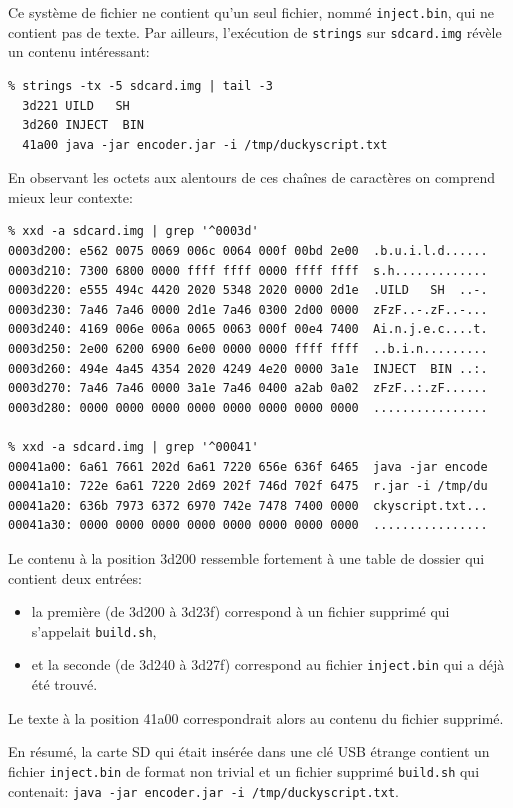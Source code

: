 \documentclass[a4paper,10pt]{article}
\begin{document}
Ce système de fichier ne contient qu'un seul fichier, nommé \texttt{inject.bin}, qui ne contient pas de texte.
Par ailleurs, l'exécution de \texttt{strings} sur \texttt{sdcard.img} révèle un contenu intéressant:
\begin{verbatim}
% strings -tx -5 sdcard.img | tail -3
  3d221 UILD   SH
  3d260 INJECT  BIN
  41a00 java -jar encoder.jar -i /tmp/duckyscript.txt
\end{verbatim}

En observant les octets aux alentours de ces chaînes de caractères on comprend mieux leur contexte:
\begin{verbatim}
% xxd -a sdcard.img | grep '^0003d'
0003d200: e562 0075 0069 006c 0064 000f 00bd 2e00  .b.u.i.l.d......
0003d210: 7300 6800 0000 ffff ffff 0000 ffff ffff  s.h.............
0003d220: e555 494c 4420 2020 5348 2020 0000 2d1e  .UILD   SH  ..-.
0003d230: 7a46 7a46 0000 2d1e 7a46 0300 2d00 0000  zFzF..-.zF..-...
0003d240: 4169 006e 006a 0065 0063 000f 00e4 7400  Ai.n.j.e.c....t.
0003d250: 2e00 6200 6900 6e00 0000 0000 ffff ffff  ..b.i.n.........
0003d260: 494e 4a45 4354 2020 4249 4e20 0000 3a1e  INJECT  BIN ..:.
0003d270: 7a46 7a46 0000 3a1e 7a46 0400 a2ab 0a02  zFzF..:.zF......
0003d280: 0000 0000 0000 0000 0000 0000 0000 0000  ................

% xxd -a sdcard.img | grep '^00041'
00041a00: 6a61 7661 202d 6a61 7220 656e 636f 6465  java -jar encode
00041a10: 722e 6a61 7220 2d69 202f 746d 702f 6475  r.jar -i /tmp/du
00041a20: 636b 7973 6372 6970 742e 7478 7400 0000  ckyscript.txt...
00041a30: 0000 0000 0000 0000 0000 0000 0000 0000  ................
\end{verbatim}

Le contenu à la position 3d200 ressemble fortement à une table de dossier qui contient deux entrées:
\begin{itemize}
  \item la première (de 3d200 à 3d23f) correspond à un fichier supprimé qui s'appelait \texttt{build.sh},
  \item et la seconde (de 3d240 à 3d27f) correspond au fichier \texttt{inject.bin} qui a déjà été trouvé.
\end{itemize}

Le texte à la position 41a00 correspondrait alors au contenu du fichier supprimé.

En résumé, la carte SD qui était insérée dans une clé USB étrange contient un fichier \texttt{inject.bin} de format non trivial et un fichier supprimé \texttt{build.sh} qui contenait:
\texttt{java -jar encoder.jar -i /tmp/duckyscript.txt}.
\end{document}
